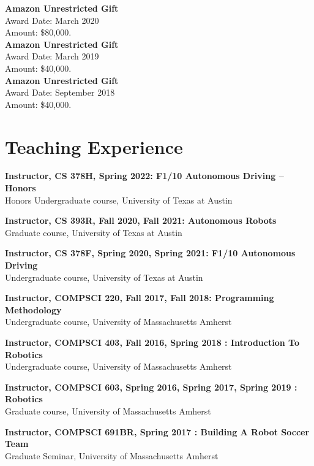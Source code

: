 \documentclass[Times]{article}
\newcommand{\funding}[1]{#1\\}
\begin{document}
\textbf{Amazon Unrestricted Gift}\\
Award Date: March 2020\\
\funding{Amount: \$80,000.}

\textbf{Amazon Unrestricted Gift}\\
Award Date: March 2019\\
\funding{Amount: \$40,000.}

\textbf{Amazon Unrestricted Gift}\\
Award Date: September 2018\\
\funding{Amount: \$40,000.}

\clearpage
\section*{Teaching Experience}

\setlength{\parskip}{1em}
{\bf Instructor, CS 378H, Spring 2022: F1/10 Autonomous Driving -- Honors}\\
Honors Undergraduate course, University of Texas at Austin

{\bf Instructor, CS 393R, Fall 2020, Fall 2021: Autonomous Robots}\\
Graduate course, University of Texas at Austin

{\bf Instructor, CS 378F, Spring 2020, Spring 2021: F1/10 Autonomous Driving}\\
Undergraduate course, University of Texas at Austin

{\bf Instructor, COMPSCI 220, Fall 2017, Fall 2018: Programming Methodology}\\
Undergraduate course, University of Massachusetts Amherst

{\bf Instructor, COMPSCI 403, Fall 2016, Spring 2018 : Introduction To
Robotics}\\
Undergraduate course, University of Massachusetts Amherst

{\bf Instructor, COMPSCI 603, Spring 2016, Spring 2017, Spring 2019 : Robotics}\\
\hfill Graduate course, University of Massachusetts Amherst

{\bf Instructor, COMPSCI 691BR, Spring 2017 : Building A Robot Soccer Team}\\
Graduate Seminar, University of Massachusetts Amherst

\begin{comment}
Updates:
5. Find all SPC, PC appointments
6. List all students
\end{comment}
\end{document}
